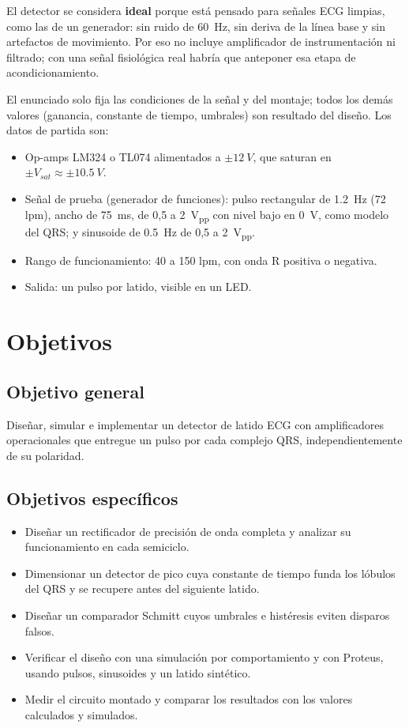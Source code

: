 \documentclass[11pt,letterpaper]{article}
\newcommand{\Vsat}{V_{sat}}
\begin{document}
El detector se considera \textbf{ideal} porque está pensado para señales ECG limpias, como las de un generador: sin ruido de \SI{60}{Hz}, sin deriva de la línea base y sin artefactos de movimiento. Por eso no incluye amplificador de instrumentación ni filtrado; con una señal fisiológica real habría que anteponer esa etapa de acondicionamiento.

El enunciado solo fija las condiciones de la señal y del montaje; todos los demás valores (ganancia, constante de tiempo, umbrales) son resultado del diseño. Los datos de partida son:
\begin{itemize}
  \item Op-amps LM324 o TL074 alimentados a $\pm\SI{12}{V}$, que saturan en $\pm\Vsat\approx\pm\SI{10,5}{V}$.
  \item Señal de prueba (generador de funciones): pulso rectangular de \SI{1,2}{Hz} (72 lpm), ancho de \SI{75}{ms}, de 0,5 a \SI{2}{V_{pp}} con nivel bajo en \SI{0}{V}, como modelo del QRS; y sinusoide de \SI{0,5}{Hz} de 0,5 a \SI{2}{V_{pp}}.
  \item Rango de funcionamiento: 40 a 150 lpm, con onda R positiva o negativa.
  \item Salida: un pulso por latido, visible en un LED.
\end{itemize}

\section{Objetivos}

\subsection{Objetivo general}
Diseñar, simular e implementar un detector de latido ECG con amplificadores operacionales que entregue un pulso por cada complejo QRS, independientemente de su polaridad.

\subsection{Objetivos específicos}
\begin{itemize}
  \item Diseñar un rectificador de precisión de onda completa y analizar su funcionamiento en cada semiciclo.
  \item Dimensionar un detector de pico cuya constante de tiempo funda los lóbulos del QRS y se recupere antes del siguiente latido.
  \item Diseñar un comparador Schmitt cuyos umbrales e histéresis eviten disparos falsos.
  \item Verificar el diseño con una simulación por comportamiento y con Proteus, usando pulsos, sinusoides y un latido sintético.
  \item Medir el circuito montado y comparar los resultados con los valores calculados y simulados.
\end{itemize}
\end{document}
